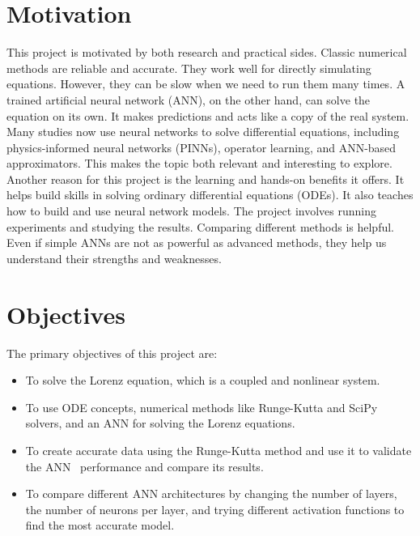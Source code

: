 \section{Motivation}
This project is motivated by both research and practical sides. Classic numerical methods are reliable and accurate. They work well for directly simulating equations. However, they can be slow when we need to run them many times. A trained artificial neural network (ANN), on the other hand, can solve the equation on its own. It makes predictions and acts like a copy of the real system. Many studies now use neural networks to solve differential equations, including physics-informed neural networks (PINNs), operator learning, and ANN-based approximators. This makes the topic both relevant and interesting to explore. Another reason for this project is the learning and hands-on benefits it offers. It helps build skills in solving ordinary differential equations (ODEs). It also teaches how to build and use neural network models. The project involves running experiments and studying the results. Comparing different methods is helpful. Even if simple ANNs are not as powerful as advanced methods, they help us understand their strengths and weaknesses.



\section{Objectives}
The primary objectives of this project are:

\begin{itemize}
    \item To solve the Lorenz equation, which is a coupled and nonlinear system.
\end{itemize}

\begin{itemize}
    \item To use ODE concepts, numerical methods like Runge-Kutta and SciPy solvers, and an ANN for solving the Lorenz equations.
\end{itemize}

\begin{itemize}
    \item To create accurate data using the Runge-Kutta method and use it to validate the ANN  performance and compare its results.
\end{itemize}

\begin{itemize}
    \item To compare different ANN architectures by changing the number of layers, the number of neurons per layer, and trying different activation functions to find the most accurate model.
\end{itemize}

